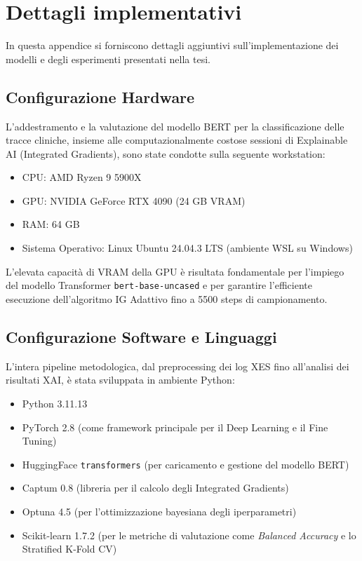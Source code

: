 
\chapter{Dettagli implementativi}

In questa appendice si forniscono dettagli aggiuntivi sull'implementazione dei modelli e degli esperimenti presentati nella tesi.

\section{Configurazione Hardware}

L'addestramento e la valutazione del modello BERT per la classificazione delle tracce cliniche, insieme alle computazionalmente costose sessioni di Explainable AI (Integrated Gradients), sono state condotte sulla seguente workstation:
\begin{itemize}
    \item CPU: AMD Ryzen 9 5900X
    \item GPU: NVIDIA GeForce RTX 4090 (24 GB VRAM)
    \item RAM: 64 GB
    \item Sistema Operativo: Linux Ubuntu 24.04.3 LTS (ambiente WSL su Windows)
\end{itemize}

L'elevata capacità di VRAM della GPU è risultata fondamentale per l'impiego del modello Transformer \texttt{bert-base-uncased} e per garantire l'efficiente esecuzione dell'algoritmo IG Adattivo fino a 5500 steps di campionamento.

\section{Configurazione Software e Linguaggi}

L'intera pipeline metodologica, dal preprocessing dei log XES fino all'analisi dei risultati XAI, è stata sviluppata in ambiente Python:
\begin{itemize}
    \item Python 3.11.13
    \item PyTorch 2.8 (come framework principale per il Deep Learning e il Fine Tuning)
    \item HuggingFace \texttt{transformers} (per caricamento e gestione del modello BERT)
    \item Captum 0.8 (libreria per il calcolo degli Integrated Gradients)
    \item Optuna 4.5 (per l'ottimizzazione bayesiana degli iperparametri)
    \item Scikit-learn 1.7.2 (per le metriche di valutazione come \textit{Balanced Accuracy} e lo Stratified K-Fold CV)
\end{itemize}

